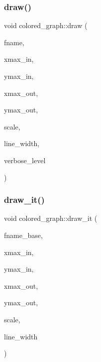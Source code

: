 \subsubsection{\texorpdfstring{draw()}{draw()}}
{\footnotesize\ttfamily void colored\+\_\+graph\+::draw (\begin{DoxyParamCaption}\item[{const \mbox{\hyperlink{galois_8h_ab6cc7b4aeb6ea31aba2b3fbfc83ff5e6}{B\+Y\+TE}} $\ast$}]{fname,  }\item[{\mbox{\hyperlink{galois_8h_a09fddde158a3a20bd2dcadb609de11dc}{I\+NT}}}]{xmax\+\_\+in,  }\item[{\mbox{\hyperlink{galois_8h_a09fddde158a3a20bd2dcadb609de11dc}{I\+NT}}}]{ymax\+\_\+in,  }\item[{\mbox{\hyperlink{galois_8h_a09fddde158a3a20bd2dcadb609de11dc}{I\+NT}}}]{xmax\+\_\+out,  }\item[{\mbox{\hyperlink{galois_8h_a09fddde158a3a20bd2dcadb609de11dc}{I\+NT}}}]{ymax\+\_\+out,  }\item[{double}]{scale,  }\item[{double}]{line\+\_\+width,  }\item[{\mbox{\hyperlink{galois_8h_a09fddde158a3a20bd2dcadb609de11dc}{I\+NT}}}]{verbose\+\_\+level }\end{DoxyParamCaption})}

\mbox{\label{classcolored__graph_a127bc92b3de713dda9f14651dad2fd57}} 
\subsubsection{\texorpdfstring{draw\+\_\+it()}{draw\_it()}}
{\footnotesize\ttfamily void colored\+\_\+graph\+::draw\+\_\+it (\begin{DoxyParamCaption}\item[{const \mbox{\hyperlink{galois_8h_ab6cc7b4aeb6ea31aba2b3fbfc83ff5e6}{B\+Y\+TE}} $\ast$}]{fname\+\_\+base,  }\item[{\mbox{\hyperlink{galois_8h_a09fddde158a3a20bd2dcadb609de11dc}{I\+NT}}}]{xmax\+\_\+in,  }\item[{\mbox{\hyperlink{galois_8h_a09fddde158a3a20bd2dcadb609de11dc}{I\+NT}}}]{ymax\+\_\+in,  }\item[{\mbox{\hyperlink{galois_8h_a09fddde158a3a20bd2dcadb609de11dc}{I\+NT}}}]{xmax\+\_\+out,  }\item[{\mbox{\hyperlink{galois_8h_a09fddde158a3a20bd2dcadb609de11dc}{I\+NT}}}]{ymax\+\_\+out,  }\item[{double}]{scale,  }\item[{double}]{line\+\_\+width }\end{DoxyParamCaption})}

